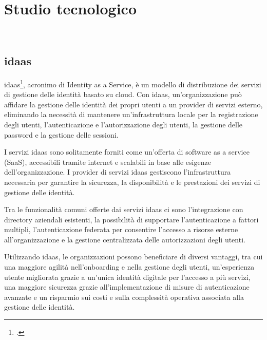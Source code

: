 
\chapter{Studio tecnologico}
\label{cap:studio-tecnologico}

\\


\section{\acrlong{idaas}}

\acrshort{idaas}\footcite{site:idaas}, acronimo di Identity as a Service, è un modello di distribuzione dei servizi di gestione delle identità basato su cloud. Con \acrshort{idaas}, un'organizzazione può affidare la gestione delle identità dei propri utenti a un provider di servizi esterno, eliminando la necessità di mantenere un'infrastruttura locale per la registrazione degli utenti, l'autenticazione e l'autorizzazione degli utenti, la gestione delle password e la gestione delle sessioni.

I servizi \acrshort{idaas} sono solitamente forniti come un'offerta di software as a service (SaaS), accessibili tramite internet e scalabili in base alle esigenze dell'organizzazione. I provider di servizi \acrshort{idaas} gestiscono l'infrastruttura necessaria per garantire la sicurezza, la disponibilità e le prestazioni dei servizi di gestione delle identità.

Tra le funzionalità comuni offerte dai servizi \acrshort{idaas} ci sono l'integrazione con directory aziendali esistenti, la possibilità di supportare l'autenticazione a fattori multipli, l'autenticazione federata per consentire l'accesso a risorse esterne all'organizzazione e la gestione centralizzata delle autorizzazioni degli utenti.

Utilizzando \acrshort{idaas}, le organizzazioni possono beneficiare di diversi vantaggi, tra cui una maggiore agilità nell'onboarding e nella gestione degli utenti, un'esperienza utente migliorata grazie a un'unica identità digitale per l'accesso a più servizi, una maggiore sicurezza grazie all'implementazione di misure di autenticazione avanzate e un risparmio sui costi e sulla complessità operativa associata alla gestione delle identità.

